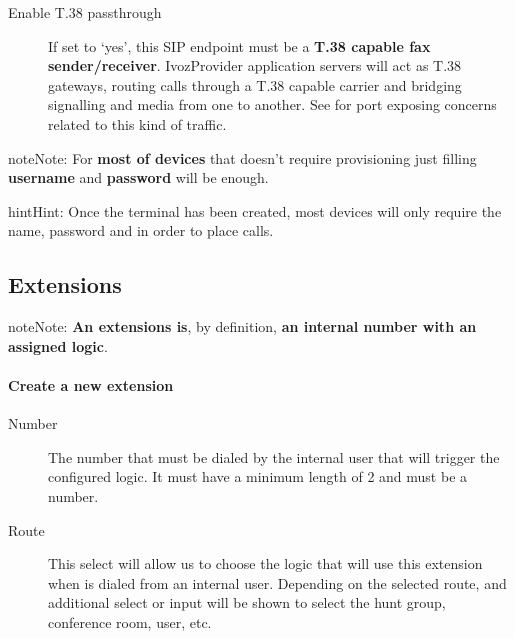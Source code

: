 \documentclass[letterpaper,10pt,english]{sphinxmanual}
\begin{document}
\begin{description}
\item[{Enable T.38 passthrough}] \leavevmode{}\label{administration_portal/client/vpbx/terminals:term-enable-t-38-passthrough}
If set to `yes', this SIP endpoint must be a \textbf{T.38 capable fax sender/receiver}. IvozProvider
application servers will act as T.38 gateways, routing calls through a T.38 capable carrier and
bridging signalling and media from one to another. See {\hyperref[security_and_maintenance/security/firewall:firewall]{}} for port exposing concerns
related to this kind of traffic.

\end{description}

\begin{notice}{note}{Note:}
For \textbf{most of devices} that doesn't require provisioning just
filling \textbf{username} and \textbf{password} will be enough.
\end{notice}

\begin{notice}{hint}{Hint:}
Once the terminal has been created, most devices will only
require the name, password and {\hyperref[getting_started/internal_calls/brand_portal:domain\string-per\string-client]{}}
in order to place calls.
\end{notice}


\subsection{Extensions}
\label{administration_portal/client/vpbx/extensions:extensions}\label{administration_portal/client/vpbx/extensions::doc}
\begin{notice}{note}{Note:}
\textbf{An extensions is}, by definition, \textbf{an internal number with an
assigned logic}.
\end{notice}
\paragraph{Create a new extension}
\begin{description}
\item[{Number}] \leavevmode{}\label{administration_portal/client/vpbx/extensions:term-number}
The number that must be dialed by the internal user that will trigger
the configured logic. It must have a minimum length of 2 and must be
a number.

\item[{Route}] \leavevmode{}\label{administration_portal/client/vpbx/extensions:term-route}
This select will allow us to choose the logic that will use this
extension when is dialed from an internal user. Depending on the selected
route, and additional select or input will be shown to select the
hunt group, conference room, user, etc.

\end{description}
\end{document}
